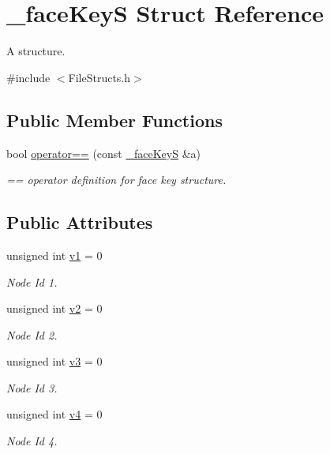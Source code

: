 \hypertarget{struct__face_key_s}{}\section{\+\_\+face\+KeyS Struct Reference}
\label{struct__face_key_s}


A structure.  




{\ttfamily \#include $<$File\+Structs.\+h$>$}

\subsection*{Public Member Functions}
\begin{DoxyCompactItemize}
\item 
bool \hyperlink{struct__face_key_s_a46bd6489b5a2f1a1eb1d1f2e7a9941fb}{operator==} (const \hyperlink{struct__face_key_s}{\+\_\+face\+KeyS} \&a)\hypertarget{struct__face_key_s_a46bd6489b5a2f1a1eb1d1f2e7a9941fb}{}\label{struct__face_key_s_a46bd6489b5a2f1a1eb1d1f2e7a9941fb}

\begin{DoxyCompactList}\small\item\em == operator definition for face key structure. \end{DoxyCompactList}\end{DoxyCompactItemize}
\subsection*{Public Attributes}
\begin{DoxyCompactItemize}
\item 
unsigned int \hyperlink{struct__face_key_s_a7dc4ab7129a845a6569c608883f54b9e}{v1} = 0
\begin{DoxyCompactList}\small\item\em Node Id 1. \end{DoxyCompactList}\item 
unsigned int \hyperlink{struct__face_key_s_ab569c6f63422ef80ecc9f68f76ed4772}{v2} = 0
\begin{DoxyCompactList}\small\item\em Node Id 2. \end{DoxyCompactList}\item 
unsigned int \hyperlink{struct__face_key_s_a9ffa3194f755b6e336c387db285821a6}{v3} = 0
\begin{DoxyCompactList}\small\item\em Node Id 3. \end{DoxyCompactList}\item 
unsigned int \hyperlink{struct__face_key_s_ae749de93a9e487bd0219653f2b51e794}{v4} = 0
\begin{DoxyCompactList}\small\item\em Node Id 4. \end{DoxyCompactList}\end{DoxyCompactItemize}



